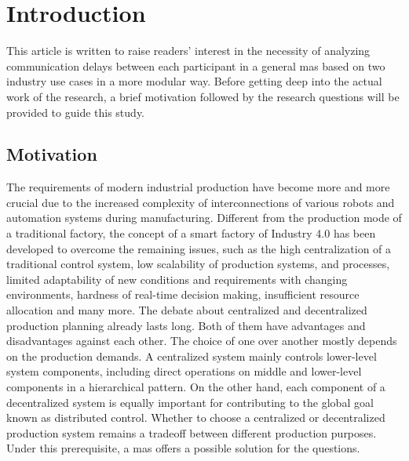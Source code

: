 \glsresetall%
\chapter{Introduction}%
This article is written to raise readers' interest in the necessity of 
analyzing communication delays between each participant in a general 
\gls{mas} based on two industry use cases in a more modular way. 
Before getting deep into the actual work of the research, 
a brief motivation followed by the research questions will be
provided to guide this study.

\section{Motivation}\label{chap: Motivation}
The requirements of modern industrial production have become more and 
more crucial due to the increased complexity of interconnections of 
various robots and automation systems during manufacturing. Different 
from the production mode of a traditional factory, the concept of a 
smart factory of Industry 4.0 has been developed to overcome the 
remaining issues, such as the high centralization of a traditional 
control system, low scalability of production systems, and processes, 
limited adaptability of new conditions and requirements with changing 
environments, hardness of real-time decision making, insufficient resource 
allocation and many more. The debate about centralized and decentralized 
production planning already lasts long\cite{eloranta2014designing}. 
Both of them have advantages and disadvantages against 
each other. The choice of one over another mostly depends on the 
production demands. A centralized system mainly controls lower-level system components, including  
direct operations on middle and lower-level components in a hierarchical 
pattern. On the other hand, each component of a decentralized system 
is equally 
important for contributing to the global goal known as distributed 
control. Whether to choose a centralized or decentralized production system 
remains a tradeoff between different production purposes. 
Under this prerequisite, a \gls{mas} offers a possible solution for the 
questions. 


